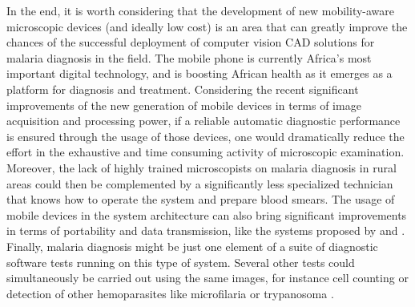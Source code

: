\documentclass[sensors,review,submit,moreauthors,pdftex,10pt,a4paper]{mdpi}
\begin{document}
In the end, it is worth considering that the development of new mobility-aware microscopic devices (and ideally low cost) is an area that can greatly improve the chances of the successful deployment of computer vision CAD solutions for malaria diagnosis in the field.
The mobile phone is currently Africa's most important digital technology, and is boosting African health as it emerges as a platform for diagnosis and treatment.
Considering the recent significant improvements of the new generation of mobile devices in terms of image acquisition and processing power, if a reliable automatic diagnostic performance is ensured through the usage of those devices, one would dramatically reduce the effort in the exhaustive and time consuming activity of microscopic examination.
Moreover, the lack of highly trained microscopists on malaria diagnosis in rural areas could then be complemented by a significantly less specialized technician that knows how to operate the system and prepare blood smears. The usage of mobile devices in the system architecture can also bring significant improvements in terms of portability and data transmission, like the systems proposed by \cite{Oliveira2017} and \cite{Rosado2017}. 
Finally, malaria diagnosis might be just one element of a suite of diagnostic software tests running on this type of system. Several other tests could simultaneously be carried out using the same images, for instance cell counting or detection of other hemoparasites like microfilaria or trypanosoma \cite{Rosado2016}.


%


\vspace{6pt} 



\end{document}

